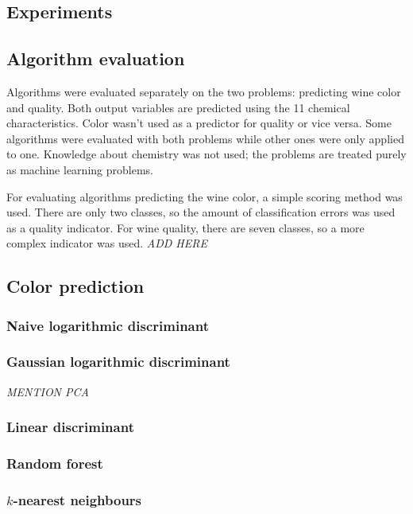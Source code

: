 \documentclass[twoside]{article}
\begin{document}
\begin{multicols}{2}

\section{Experiments}

\subsection{Algorithm evaluation}

Algorithms were evaluated separately on the two problems: predicting wine color and quality.
Both output variables are predicted using the 11 chemical characteristics. Color wasn't used
as a predictor for quality or vice versa.
Some algorithms were evaluated with both problems while other ones were only applied to one.
Knowledge about chemistry was not used; the problems are treated purely as machine learning
problems.

For evaluating algorithms predicting the wine color, a simple scoring method was used.
There are only two classes, so the amount of classification errors was used as a quality indicator.
For wine quality, there are seven classes, so a more complex indicator was used. \emph{ADD HERE}

\subsection{Color prediction}

\subsubsection{Naive logarithmic discriminant}

\subsubsection{Gaussian logarithmic discriminant}

\emph{MENTION PCA}

\subsubsection{Linear discriminant}

\subsubsection{Random forest}

\subsubsection{$k$-nearest neighbours}


\end{multicols}
\end{document}
